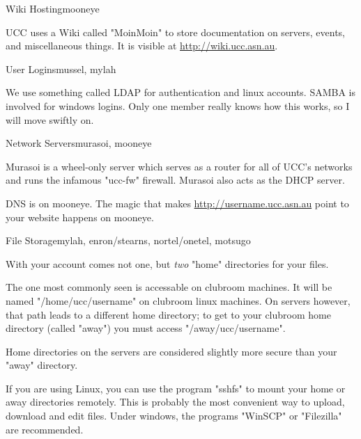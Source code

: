 \begin{uccservice}{Wiki Hosting}{mooneye}

UCC uses a Wiki called "MoinMoin" to store documentation on servers, events, and miscellaneous things. It is visible at \url{http://wiki.ucc.asn.au}.

\end{uccservice}

\begin{uccservice}{User Logins}{mussel, mylah}

We use something called LDAP for authentication and linux accounts. SAMBA is involved for windows logins. Only one member really knows how this works, so I will move swiftly on.

\end{uccservice}

\begin{uccservice}{Network Servers}{murasoi, mooneye}

Murasoi is a wheel-only server which serves as a router for all of UCC's networks and runs the infamous "ucc-fw" firewall. Murasoi also acts as the DHCP server.

DNS is on mooneye. The magic that makes \url{http://username.ucc.asn.au} point to your website happens on mooneye.

\end{uccservice}

\pagebreak

\begin{uccservice}{File Storage}{mylah, enron/stearns, nortel/onetel, motsugo}

With your account comes not one, but \emph{two} "home" directories for your files.

The one most commonly seen is accessable on clubroom machines. It will be named "/home/ucc/username" on clubroom linux machines. On servers however, that path leads to a different home directory; to get to your clubroom home directory (called "away") you must access "/away/ucc/username".

Home directories on the servers are considered slightly more secure than your "away" directory. 


If you are using Linux, you can use the program "sshfs" to mount your home or away directories remotely. This is probably the most convenient way to upload, download and edit files. Under windows, the programs "WinSCP" or "Filezilla" are recommended.




\end{uccservice}

